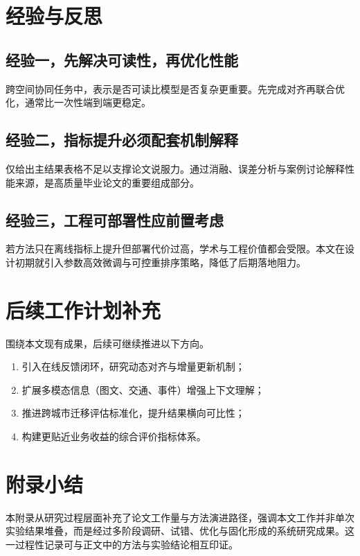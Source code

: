 \section{经验与反思}
\subsection{经验一，先解决可读性，再优化性能}
跨空间协同任务中，表示是否可读比模型是否复杂更重要。先完成对齐再联合优化，通常比一次性端到端更稳定。

\subsection{经验二，指标提升必须配套机制解释}
仅给出主结果表格不足以支撑论文说服力。通过消融、误差分析与案例讨论解释性能来源，是高质量毕业论文的重要组成部分。

\subsection{经验三，工程可部署性应前置考虑}
若方法只在离线指标上提升但部署代价过高，学术与工程价值都会受限。本文在设计初期就引入参数高效微调与可控重排序策略，降低了后期落地阻力。

\section{后续工作计划补充}
围绕本文现有成果，后续可继续推进以下方向。
\begin{enumerate}
    \item 引入在线反馈闭环，研究动态对齐与增量更新机制；
    \item 扩展多模态信息（图文、交通、事件）增强上下文理解；
    \item 推进跨城市迁移评估标准化，提升结果横向可比性；
    \item 构建更贴近业务收益的综合评价指标体系。
\end{enumerate}

\section{附录小结}
本附录从研究过程层面补充了论文工作量与方法演进路径，强调本文工作并非单次实验结果堆叠，而是经过多阶段调研、试错、优化与固化形成的系统研究成果。这一过程性记录可与正文中的方法与实验结论相互印证。
